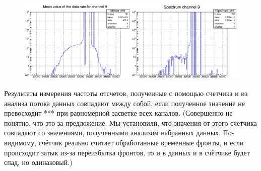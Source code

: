 

\begin{figure}
\includegraphics[width=1.0\textwidth]{pictures/TDCscalerScan.png}
\caption{}
\label{fig:TDCscalerScan}
\end{figure}

Результаты измерения частоты отсчетов, полученные с помощью счетчика и из анализа потока данных совпадают между собой, если полученное значение не превосходит *** при равномерной засветке всех каналов. (Совершенно не понятно, что это за предложение. Мы установили, что значения от этого счётчика совпадают со значениями, полученными анализом набранных данных. По-видимому, счётчик реально считает обработанные временные фронты, и если происходит затык из-за переизбытка фронтов, то и в данных и в счётчике будет спад, но одинаковый.)

